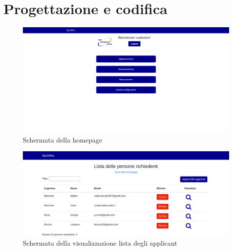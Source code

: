 
\chapter{Progettazione e codifica}
\label{cap:progettazione-codifica}

\vspace{0.5em}
\begin{figure}[!h] 
	\centering 
	\includegraphics[width=1\columnwidth]{immagini/svil/homepage} 
	\caption{Schermata della homepage}
	\label{figura:homepage}
\end{figure}

\vspace{0.5em}
\begin{figure}[!h] 
	\centering 
	\includegraphics[width=1\columnwidth]{immagini/svil/lista} 
	\caption{Schermata della visualizzazione lista degli applicant}
	\label{figura:lista}
\end{figure}

